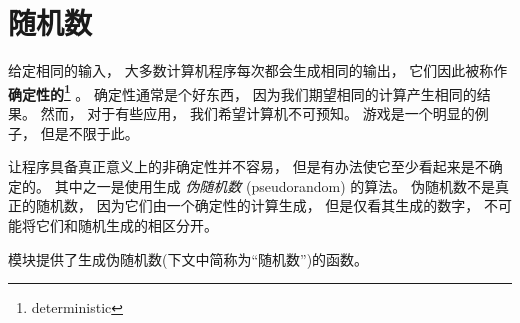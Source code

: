 \section{随机数}


给定相同的输入， 大多数计算机程序每次都会生成相同的输出，
它们因此被称作 {\bf 确定性的\footnote{deterministic}}  。
确定性通常是个好东西， 因为我们期望相同的计算产生相同的结果。
然而， 对于有些应用， 我们希望计算机不可预知。
游戏是一个明显的例子， 但是不限于此。


让程序具备真正意义上的非确定性并不容易， 但是有办法使它至少看起来是不确定的。
其中之一是使用生成 {\em 伪随机数} (pseudorandom) 的算法。
伪随机数不是真正的随机数， 因为它们由一个确定性的计算生成，
但是仅看其生成的数字， 不可能将它们和随机生成的相区分开。



 模块提供了生成伪随机数(下文中简称为``随机数'')的函数。



